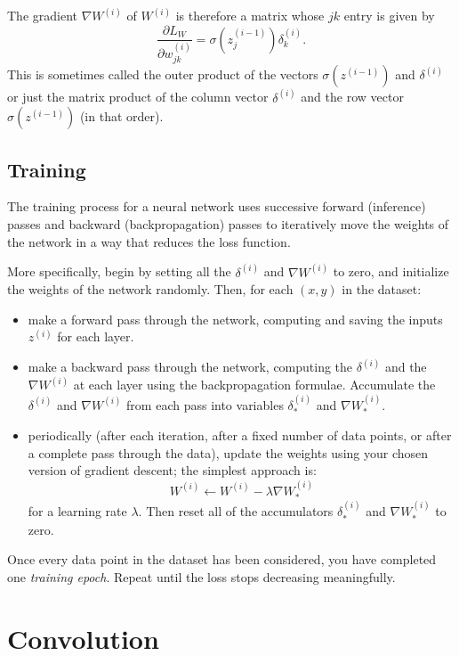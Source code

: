 \documentclass[
  11pt,
  letterpaper,
]{scrbook}
\theoremstyle{plain}
\theoremstyle{remark}
\begin{document}
The gradient \(\nabla W^{(i)}\) of \(W^{(i)}\) is therefore a matrix
whose \(jk\) entry is given by \[
\frac{\partial L_{W}}{\partial w^{(i)}_{jk}}=\sigma(z^{(i-1)}_{j})\delta^{(i)}_{k}.
\] This is sometimes called the outer product of the vectors
\(\sigma(z^{(i-1)})\) and \(\delta^{(i)}\) or just the matrix product of
the column vector \(\delta^{(i)}\) and the row vector
\(\sigma(z^{(i-1)})\) (in that order).

\hypertarget{training}{%
\subsection{Training}\label{training}}

The training process for a neural network uses successive forward
(inference) passes and backward (backpropagation) passes to iteratively
move the weights of the network in a way that reduces the loss function.

More specifically, begin by setting all the \(\delta^{(i)}\) and
\(\nabla W^{(i)}\) to zero, and initialize the weights of the network
randomly. Then, for each \((x,y)\) in the dataset:

\begin{itemize}
\item
  make a forward pass through the network, computing and saving the
  inputs \(z^{(i)}\) for each layer.
\item
  make a backward pass through the network, computing the
  \(\delta^{(i)}\) and the \(\nabla W^{(i)}\) at each layer using the
  backpropagation formulae. Accumulate the \(\delta^{(i)}\) and
  \(\nabla W^{(i)}\) from each pass into variables \(\delta^{(i)}_{*}\)
  and \(\nabla W^{(i)}_{*}\).
\item
  periodically (after each iteration, after a fixed number of data
  points, or after a complete pass through the data), update the weights
  using your chosen version of gradient descent; the simplest approach
  is: \[
  W^{(i)} \leftarrow W^{(i)}-\lambda \nabla W^{(i)}_{*}
  \] for a learning rate \(\lambda\). Then reset all of the accumulators
  \(\delta^{(i)}_{*}\) and \(\nabla W^{(i)}_{*}\) to zero.
\end{itemize}

Once every data point in the dataset has been considered, you have
completed one \emph{training epoch}. Repeat until the loss stops
decreasing meaningfully.

\hypertarget{convolution}{%
\section{Convolution}\label{convolution}}
\end{document}
